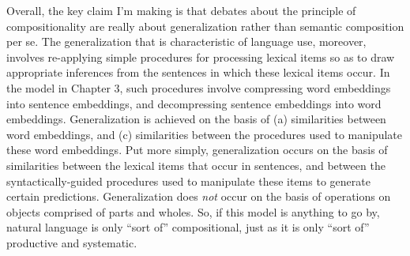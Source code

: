 Overall, the key claim I'm making is that debates about the principle of compositionality are really about generalization rather than semantic composition per se. The generalization that is characteristic of language use, moreover, involves re-applying simple procedures for processing lexical items so as to draw appropriate inferences from the sentences in which these lexical items occur. In the model in Chapter 3, such procedures involve compressing word embeddings into sentence embeddings, and decompressing sentence embeddings into word embeddings. Generalization is achieved on the basis of (a) similarities between word embeddings, and (c) similarities between the procedures used to manipulate these word embeddings. Put more simply, generalization occurs on the basis of similarities between the lexical items that occur in sentences, and between the syntactically-guided procedures used to manipulate these items to generate certain predictions. Generalization does \textit{not} occur on the basis of operations on objects comprised of parts and wholes. So, if this model is anything to go by, natural language is only ``sort of'' compositional, just as it is only ``sort of'' productive and systematic. 